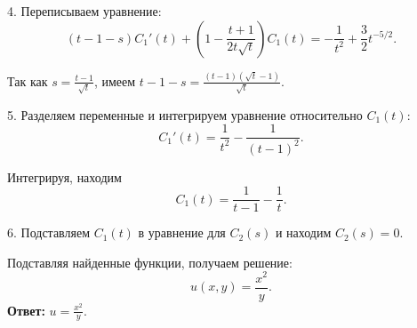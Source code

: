 \documentclass[a4paper,12pt]{article}
\begin{document}
     4. Переписываем уравнение:
        \begin{equation*}
            (t - 1 - s) C_1'(t) + \left(1 - \frac{t + 1}{2t \sqrt{t}} \right) C_1(t) = -\frac{1}{t^2} + \frac{3}{2} t^{-5/2}.
        \end{equation*}
        
        Так как $ s = \frac{t - 1}{\sqrt{t}} $, имеем $ t - 1 - s = \frac{(t - 1)(\sqrt{t} - 1)}{\sqrt{t}} $.
        
     5. Разделяем переменные и интегрируем уравнение относительно $ C_1(t) $:
        \begin{equation*}
            C_1'(t) = \frac{1}{t^2} - \frac{1}{(t - 1)^2}.
        \end{equation*}
        
        Интегрируя, находим
        \begin{equation*}
            C_1(t) = \frac{1}{t - 1} - \frac{1}{t}.
        \end{equation*}
        
     6. Подставляем $ C_1(t) $ в уравнение для $ C_2(s) $ и находим $ C_2(s) = 0 $.
     
     Подставляя найденные функции, получаем решение:
     \begin{equation*}
         u(x,y) = \frac{x^2}{y}.
     \end{equation*}
     \textbf{Ответ:} $u =\frac{x^2}{y}$.
             
\end{document}
